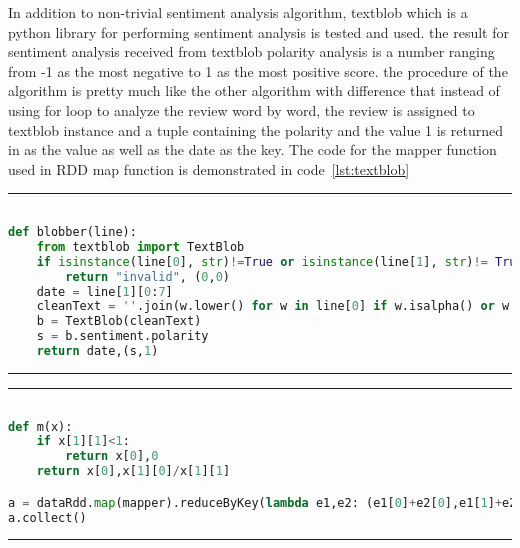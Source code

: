 In addition to non-trivial sentiment analysis algorithm, textblob which is a python library for performing sentiment analysis is tested and used. the result for sentiment analysis received from textblob polarity analysis is a number ranging from -1 as the most negative to 1 as the most positive score. the procedure of the algorithm is pretty much like the other algorithm with difference that instead of using for loop to analyze the review word by word, the review is assigned to textblob instance and a tuple containing the polarity and the value 1 is returned in as the value as well as the date as the key. The code for the mapper function used in RDD map function is demonstrated in code~\ref{lst:textblob} 

\rule{200 pt}{0.5 pt} 

\renewcommand{\lstlistingname}{Code}
\lstset{style=mystyle}
\begin{lstlisting}[language=Python, caption={Sentiment analysis textblob algorithm spark RDD mapper function }, label={lst:textblob}, mathescape = true, breaklines=true]

def blobber(line): 
    from textblob import TextBlob 
    if isinstance(line[0], str)!=True or isinstance(line[1], str)!= True: 
        return "invalid", (0,0)
    date = line[1][0:7]
    cleanText = ''.join(w.lower() for w in line[0] if w.isalpha() or w == " ")
    b = TextBlob(cleanText) 
    s = b.sentiment.polarity 
    return date,(s,1) 


\end{lstlisting}

\rule{200 pt}{0.5 pt}







\rule{200 pt}{0.5 pt} 

\renewcommand{\lstlistingname}{Code}
\lstset{style=mystyle}
\begin{lstlisting}[language=Python, caption={Spark mapper and reducer on RDD}, label={lst:mrSpark}, mathescape = true, breaklines=true]

def m(x):
    if x[1][1]<1:
        return x[0],0
    return x[0],x[1][0]/x[1][1] 

a = dataRdd.map(mapper).reduceByKey(lambda e1,e2: (e1[0]+e2[0],e1[1]+e2[1])).map(m)
a.collect()


\end{lstlisting}

\rule{200 pt}{0.5 pt}


